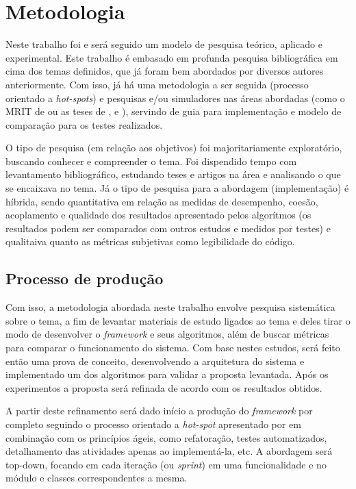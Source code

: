 \chapter[Metodologia]{Metodologia}

Neste trabalho foi e será seguido um modelo de pesquisa teórico, aplicado e experimental. Este trabalho é embasado em profunda pesquisa bibliográfica em cima dos temas definidos, que já foram bem abordados por diversos autores anteriormente. Com isso, já há uma metodologia a ser seguida (processo orientado a \textit{hot-spots}) e pesquisas e/ou simuladores nas áreas abordadas (como o MRIT de \cite{Guzman2008} ou as teses de \cite{Souza2008}, \cite{Thomsen2010} e \cite{Strandberg2004}), servindo de guia para implementação e modelo de comparação para os testes realizados.

O tipo de pesquisa (em relação aos objetivos) foi majoritariamente exploratório, buscando conhecer e compreender o tema. Foi dispendido tempo com levantamento bibliográfico, estudando teses e artigos na área e analisando o que se encaixava no tema. Já o tipo de pesquisa para a abordagem (implementação) é híbrida, sendo quantitativa em relação as medidas de desempenho, coesão, acoplamento e qualidade dos resultados apresentado pelos algorítmos (os resultados podem ser comparados com outros estudos e medidos por testes) e qualitaiva quanto as métricas subjetivas como legibilidade do código.

\section{Processo de produção}

Com isso, a metodologia abordada neste trabalho envolve pesquisa sistemática sobre o tema, a fim de levantar materiais de estudo ligados ao tema e deles tirar o modo de desenvolver o \textit{framework} e seus algoritmos, além de buscar métricas para comparar o funcionamento do sistema. Com base nestes estudos, será feito então uma prova de conceito, desenvolvendo a arquitetura do sistema e implementado um dos algoritmos para validar a proposta levantada. Após os experimentos a proposta será refinada de acordo com os resultados obtidos.

A partir deste refinamento será dado início a produção do \textit{framework} por completo seguindo o processo orientado a \textit{hot-spot} apresentado por \cite{Fayad1999} em combinação com os princípios ágeis, como refatoração, testes automatizados, detalhamento das atividades apenas ao implementá-la, etc. A abordagem será top-down, focando em cada iteração (ou \textit{sprint}) em uma funcionalidade e no módulo e classes correspondentes a mesma. 

